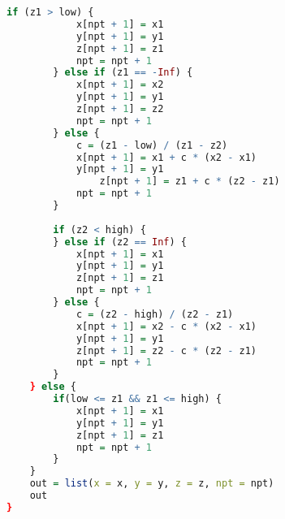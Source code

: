 \begin{lstlisting}[language = R]
        if (z1 > low) {
            x[npt + 1] = x1
            y[npt + 1] = y1
            z[npt + 1] = z1
            npt = npt + 1
        } else if (z1 == -Inf) {
            x[npt + 1] = x2
            y[npt + 1] = y1
            z[npt + 1] = z2
            npt = npt + 1
        } else { 
            c = (z1 - low) / (z1 - z2)
            x[npt + 1] = x1 + c * (x2 - x1)
            y[npt + 1] = y1
                z[npt + 1] = z1 + c * (z2 - z1)
            npt = npt + 1
        }
        
        if (z2 < high) {
        } else if (z2 == Inf) {
            x[npt + 1] = x1
            y[npt + 1] = y1
            z[npt + 1] = z1
            npt = npt + 1
        } else {
            c = (z2 - high) / (z2 - z1)
            x[npt + 1] = x2 - c * (x2 - x1)
            y[npt + 1] = y1
            z[npt + 1] = z2 - c * (z2 - z1)
            npt = npt + 1
        }
    } else {
        if(low <= z1 && z1 <= high) {
            x[npt + 1] = x1
            y[npt + 1] = y1
            z[npt + 1] = z1
            npt = npt + 1
        }
    }
    out = list(x = x, y = y, z = z, npt = npt)
    out
}

\end{lstlisting}

